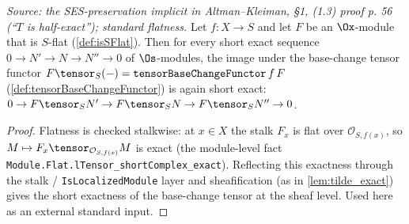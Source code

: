 \begin{theorem}
  \label{thm:flat_tensor_exact}
  \textit{Source: the SES-preservation implicit in Altman--Kleiman, §1, (1.3) proof
  p. 56 (``$T$ is half-exact''); standard flatness.}
  Let $f : X \to S$ and let $F$ be an $\Ox$-module that is $S$-flat
  (\cref{def:isSFlat}). Then for every short exact sequence
  $0 \to N' \to N \to N'' \to 0$ of $\Os$-modules, the image under the base-change
  tensor functor $F \tensor_S (-) = \mathtt{tensorBaseChangeFunctor}\,f\,F$
  (\cref{def:tensorBaseChangeFunctor}) is again short exact:
  $0 \to F\tensor_S N' \to F\tensor_S N \to F\tensor_S N'' \to 0$.
  \begin{proof}
    Flatness is checked stalkwise: at $x \in X$ the stalk $F_x$ is flat over
    $\mathcal{O}_{S,f(x)}$, so $M \mapsto F_x \tensor_{\mathcal{O}_{S,f(x)}} M$ is
    exact (the module-level fact \texttt{Module.Flat.lTensor\_shortComplex\_exact}).
    Reflecting this exactness through the stalk / \texttt{IsLocalizedModule} layer
    and sheafification (as in \cref{lem:tilde_exact}) gives the short exactness of
    the base-change tensor at the sheaf level. Used here as an external standard
    input.
  \end{proof}
\end{theorem}

